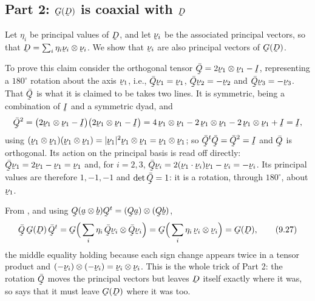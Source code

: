 \subsection*{Part 2: $\bG(\bD)$ is coaxial with $\bD$}

Let $\eta_{i}$ be principal values of $\bD$, and let $\bnu_{i}$ be the
associated principal vectors, so that
$\bD=\sum_{i}\eta_{i}\bnu_{i}\otimes\bnu_{i}$. We show that $\bnu_{i}$
are also principal vectors of $\bG(\bD)$.

To prove this claim consider the orthogonal tensor
$\bar\bQ=2\bnu_{1}\otimes\bnu_{1}-\I$, representing a $180^{\circ}$
rotation about the axis $\bnu_{1}$, i.e., $\bar\bQ\bnu_{1}=\bnu_{1}$,
$\bar\bQ\bnu_{2}=-\bnu_{2}$ and $\bar\bQ\bnu_{3}=-\bnu_{3}$. That
$\bar\bQ$ is what it is claimed to be takes two lines. It is symmetric,
being a combination of $\I$ and a symmetric dyad, and
\[
   \bar\bQ^{2}=\big(2\bnu_{1}\otimes\bnu_{1}-\I\big)
               \big(2\bnu_{1}\otimes\bnu_{1}-\I\big)
   =4\,\bnu_{1}\otimes\bnu_{1}-2\,\bnu_{1}\otimes\bnu_{1}
    -2\,\bnu_{1}\otimes\bnu_{1}+\I=\I ,
\]
using $(\bnu_{1}\otimes\bnu_{1})(\bnu_{1}\otimes\bnu_{1})
=|\bnu_{1}|^{2}\bnu_{1}\otimes\bnu_{1}=\bnu_{1}\otimes\bnu_{1}$; so
$\bar\bQ^{t}\bar\bQ=\bar\bQ^{2}=\I$ and $\bar\bQ$ is orthogonal. Its
action on the principal basis is read off directly:
$\bar\bQ\bnu_{1}=2\bnu_{1}-\bnu_{1}=\bnu_{1}$ and, for $i=2,3$,
$\bar\bQ\bnu_{i}=2(\ip{\bnu_{1}}{\bnu_{i}})\bnu_{1}-\bnu_{i}=-\bnu_{i}$.
Its principal values are therefore $1,-1,-1$ and $\det\bar\bQ=1$: it is
a rotation, through $180^{\circ}$, about $\bnu_{1}$.

From , and using $\bQ(\ba\otimes\bb)\bQ^{t}
=(\bQ\ba)\otimes(\bQ\bb)$,
\begin{equation}
   \bar\bQ\,\bG(\bD)\,\bar\bQ^{t}
   =\bG\Big(\sum_{i}\eta_{i}\,\bar\bQ\bnu_{i}\otimes\bar\bQ\bnu_{i}\Big)
   =\bG\Big(\sum_{i}\eta_{i}\,\bnu_{i}\otimes\bnu_{i}\Big)
   =\bG(\bD),
   \tag{9.27}\label{eq:9.27}
\end{equation}
the middle equality holding because each sign change appears twice in a
tensor product and $(-\bnu_{i})\otimes(-\bnu_{i})
=\bnu_{i}\otimes\bnu_{i}$. This is the whole trick of Part 2: the
rotation $\bar\bQ$ moves the principal vectors but leaves $\bD$ itself
exactly where it was, so  says that it must leave $\bG(\bD)$
where it was too.


